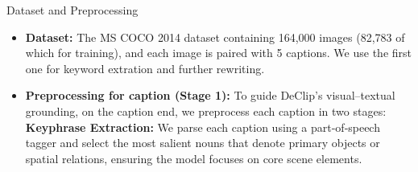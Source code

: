 \documentclass[final]{beamer}
\newlength{\colwidth}
\begin{document}
\begin{frame}[t]
\begin{columns}[t]
\begin{column}{\colwidth}
 \begin{block}{Dataset and Preprocessing}
  \begin{itemize}
    \item \textbf{Dataset:} The MS COCO 2014 dataset containing 164{,}000 images (82{,}783 of which for training), and each image is paired with 5 captions. We use the first one for keyword extration and further rewriting.
    
    \item \textbf{Preprocessing for caption (Stage 1):} To guide DeClip’s visual–textual grounding, on the caption end, we preprocess each caption in two stages:\\
        \textbf{Keyphrase Extraction:} We parse each caption using a part‑of‑speech tagger and select the most salient nouns that denote primary objects or spatial relations, ensuring the model focuses on core scene elements.
        

\end{itemize}
\end{block}
\end{column}
\end{columns}
\end{frame}
\end{document}
